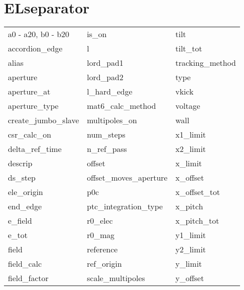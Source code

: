  \section{ELseparator}
 \label{s:list.elseparator}
 
 \begin{tabular}{lll} \toprule
a0 - a20, b0 - b20          & is_on                       & tilt                        \\
accordion_edge              & l                           & tilt_tot                    \\
alias                       & lord_pad1                   & tracking_method             \\
aperture                    & lord_pad2                   & type                        \\
aperture_at                 & l_hard_edge                 & vkick                       \\
aperture_type               & mat6_calc_method            & voltage                     \\
create_jumbo_slave          & multipoles_on               & wall                        \\
csr_calc_on                 & num_steps                   & x1_limit                    \\
delta_ref_time              & n_ref_pass                  & x2_limit                    \\
descrip                     & offset                      & x_limit                     \\
ds_step                     & offset_moves_aperture       & x_offset                    \\
ele_origin                  & p0c                         & x_offset_tot                \\
end_edge                    & ptc_integration_type        & x_pitch                     \\
e_field                     & r0_elec                     & x_pitch_tot                 \\
e_tot                       & r0_mag                      & y1_limit                    \\
field                       & reference                   & y2_limit                    \\
field_calc                  & ref_origin                  & y_limit                     \\
field_factor                & scale_multipoles            & y_offset                    \\

\end{tabular}
